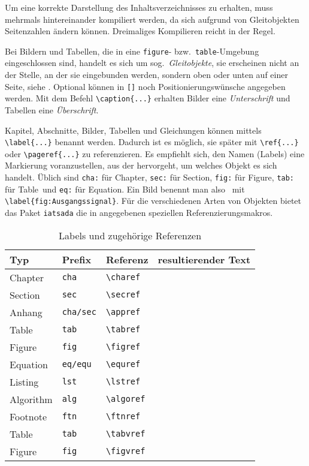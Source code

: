 Um eine korrekte Darstellung des Inhaltsverzeichnisses zu erhalten, muss \ggf mehrmals hintereinander kompiliert werden, da sich aufgrund von
Gleitobjekten Seitenzahlen ändern können.
Dreimaliges Kompilieren reicht in der Regel.

Bei Bildern und Tabellen, die in eine \verb|figure|- bzw.\ \verb|table|-Umgebung eingeschlossen sind, handelt es sich um sog.\ \emph{Gleitobjekte}, \dah sie erscheinen nicht an der Stelle, an der sie eingebunden werden, sondern oben oder unten auf einer Seite, siehe \zB {}.
Optional können in \verb|[]| noch Positionierungswünsche angegeben werden.
Mit dem Befehl \verb|\caption{...}| erhalten Bilder eine \emph{Unterschrift} und Tabellen eine \emph{Überschrift}.

Kapitel, Abschnitte, Bilder, Tabellen und Gleichungen können mittels \verb|\label{...}| benannt werden.
Dadurch ist es möglich, sie später mit \verb|\ref{...}| oder \verb|\pageref{...}| zu referenzieren.
Es empfiehlt sich, den Namen (Labels) eine Markierung voranzustellen, aus der hervorgeht, um welches Objekt es sich handelt.
Üblich sind \verb|cha:| für \glqq Chapter\grqq, \verb|sec:| für \glqq Section\grqq, \verb|fig:| für \glqq Figure\grqq, \verb|tab:| für \glqq Table\grqq\ und \verb|eq:| für \glqq Equation\grqq.
Ein Bild benennt man also \zB\ mit \verb|\label{fig:Ausgangssignal}|.
Für die verschiedenen Arten von Objekten bietet das Paket \texttt{iatsada} die in  angegebenen speziellen Referenzierungsmakros.
\begin{table}
	\centering
	\caption{Labels und zugehörige Referenzen}
	\label{tab:Referenzen}  
	\begin{tabular}{llll}
		Typ			&	Prefix				&	Referenz			&	resultierender Text\\
    \midrule
		Chapter		&	\texttt{cha}		&	\verb|\charef|		&	\charef{cha:Hinweise_Latex}\\
		Section		&	\texttt{sec}		&	\verb|\secref|		&	\secref{sec:Latex-Gliederung}\\
		Anhang		&	\texttt{cha/sec}	&	\verb|\appref|	&	\appref{cha:Checkliste}\\
		Table		&	\texttt{tab}		&	\verb|\tabref|		&	\tabref{tab:Referenzen}\\
		Figure		&	\texttt{fig}		&	\verb|\figref|		&	\figref{fig:Standardregelkreis}\\
		Equation	&	\texttt{eq/equ}		&	\verb|\equref|		&	\equref{eq:Allgemein-Approx}\\
		Listing		&	\texttt{lst}		&	\verb|\lstref|		&	\lstref{lst:Listing1}\\
		Algorithm	&	\texttt{alg}		&	\verb|\algoref|		&	\algoref{lst:Listing1}\\
		Footnote	&	\texttt{ftn}		&	\verb|\ftnref|		&	\ftnref{ftn:Fussnote1}\\
    \midrule
		Table		&	\texttt{tab}		&	\verb|\tabvref|		&	\tabvref{tab:Systemparameter}\\
		Figure		&	\texttt{fig}		&	\verb|\figvref|		&	\figvref{fig:Standardregelkreis}\\
    \bottomrule
	\end{tabular}
\end{table}

